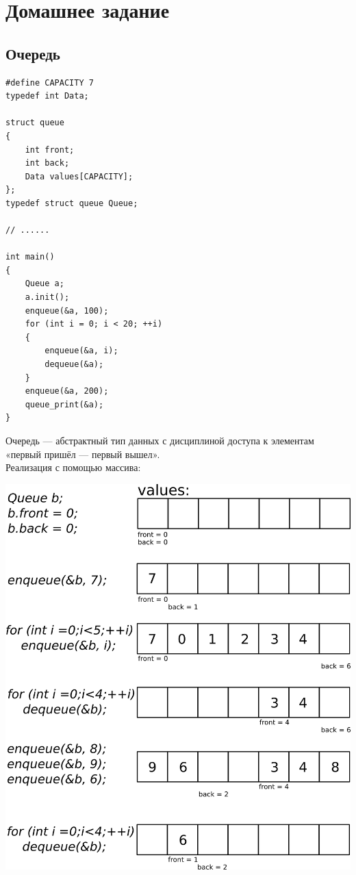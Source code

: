 \documentclass{article}
\begin{document}


\section*{Домашнее задание}
\subsection*{Очередь}
\begin{multicols}{2}
\begin{verbatim}
#define CAPACITY 7
typedef int Data;

struct queue
{
    int front;
    int back;
    Data values[CAPACITY];
};
typedef struct queue Queue;

// ......

int main()
{
    Queue a;
    a.init();
    enqueue(&a, 100);
    for (int i = 0; i < 20; ++i)
    {
        enqueue(&a, i);
        dequeue(&a);
    }
    enqueue(&a, 200);
    queue_print(&a);
}
\end{verbatim}
Очередь — абстрактный тип данных с дисциплиной доступа к элементам «первый пришёл — первый вышел». \\
Реализация с помощью массива:

\begin{center}
\includegraphics[width=0.95\linewidth]{../images/queue.png}
\end{center}
\end{multicols}
\end{document}
